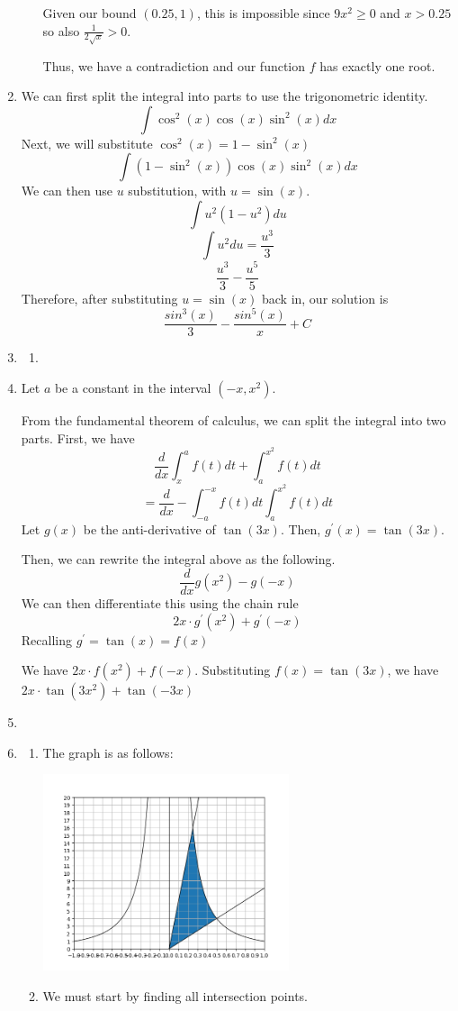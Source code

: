\documentclass[11pt, letterpaper, twoside]{article}
\begin{document}
\begin{enumerate}
\begin{enumerate}[label=\alph*)]
Given our bound \((0.25, 1)\), this is impossible since \(9x^2\geq0\) and \(x>0.25\) so also \(\frac{1}{2\sqrt x}>0\).

Thus, we have a contradiction and our function \(f\) has exactly one root.

\end{enumerate}
\item %
We can first split the integral into parts to use the trigonometric identity.
\[\int \cos^2(x)\cos(x)\sin^2(x)dx\]
Next, we will substitute \(\cos^2(x)=1-\sin^2(x)\)
\[\int(1-\sin^2(x))\cos(x)\sin^2(x)dx\]
We can then use \(u\) substitution, with \(u=\sin(x)\). 
\[\int u^2(1-u^2)du\]
\[\int u^2du = \frac{u^3}{3}\]
\[\frac{u^3}{3}-\frac{u^5}{5}\]
Therefore, after substituting \(u=\sin(x)\) back in, our solution is 
\[\frac{sin^3(x)}{3}-\frac{sin^5(x)}{x}+C\]

\item %
\begin{enumerate}[label=\alph*)]
\item  %
\end{enumerate}

\item %
Let \(a\) be a constant in the interval \((-x, x^2)\).

From the fundamental theorem of calculus, we can split the integral into two parts. 
First, we have 
\[\frac{d}{dx}\int_x^a f(t)dt+\int_a^{x^2}f(t)dt\]
\[=\frac{d}{dx}-\int_{-a}^{-x}f(t)dt\int_a^{x^2}f(t)dt\]
Let \(g(x)\) be the anti-derivative of \(\tan(3x)\). Then, \(g^\prime(x)=\tan(3x)\).

Then, we can rewrite the integral above as the following.
\[\frac{d}{dx}g(x^2)-g(-x)\]
We can then differentiate this using the chain rule
\[2x\cdot g^\prime(x^2)+g^\prime (-x)\]
Recalling \(g^\prime=\tan (x) = f(x)\)

We have \(2x\cdot f(x^2)+f(-x)\). 
Substituting \(f(x)=\tan(3x)\), we have \(\boxed{2x\cdot\tan(3x^2)+\tan(-3x)}\)

\item %


\item %
\begin{enumerate}[label=\alph*)]
\item The graph is as follows:

\includegraphics[width=0.6\textwidth]{q5}\par\vspace{1cm}
\item %
We must start by finding all intersection points.


\end{enumerate}
\end{enumerate}
\end{document}
